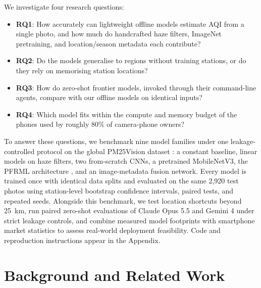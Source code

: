 \documentclass[conference]{IEEEtran}
\begin{document}
We investigate four research questions:
\begin{itemize}
  \item \textbf{RQ1}: How accurately can lightweight offline models estimate AQI
        from a single photo, and how much do handcrafted haze filters, ImageNet
        pretraining, and location/season metadata each contribute?
  \item \textbf{RQ2}: Do the models generalise to regions without training
        stations, or do they rely on memorising station locations?
  \item \textbf{RQ3}: How do zero-shot frontier models, invoked through their
        command-line agents, compare with our offline models on identical inputs?
  \item \textbf{RQ4}: Which model fits within the compute and memory budget of
        the phones used by roughly 80\% of camera-phone owners?
\end{itemize}

To answer these questions, we benchmark nine model families under one
leakage-controlled protocol on the global PM25Vision dataset
\cite{pm25vision2025}: a constant baseline, linear models on haze filters, two
from-scratch CNNs, a pretrained MobileNetV3, the PFRML architecture
\cite{wangPrototypeFeatureRepresentationGuided2026}, and an image-metadata
fusion network. Every model is trained once with identical data splits and
evaluated on the same 2,920 test photos using station-level bootstrap confidence
intervals, paired tests, and repeated seeds. Alongside this benchmark, we test
location shortcuts beyond 25~km, run paired zero-shot evaluations of Claude
Opus 5.5 and Gemini 4 under strict leakage controls, and combine measured model
footprints with smartphone market statistics to assess real-world deployment
feasibility. Code and reproduction instructions appear in the Appendix.

\section{Background and Related Work}\label{sec:related}
\end{document}
